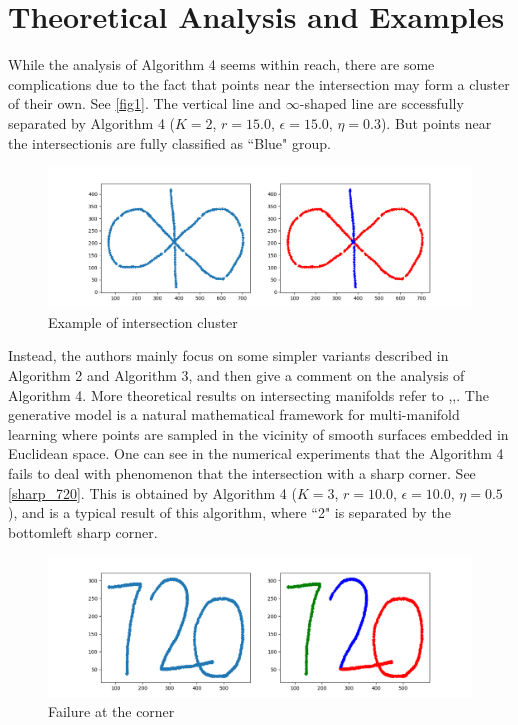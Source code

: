 \documentclass[twoside,11pt]{article}
\begin{document}
\section{Theoretical Analysis and Examples}
While the analysis of Algorithm 4 seems within reach, there are some complications due to the fact that points near the intersection may form a cluster of their own.
See \autoref{fig1}.
The vertical line and $\infty$-shaped line are sccessfully separated by Algorithm 4 ($K = 2$, $r = 15.0$, $\epsilon = 15.0$, $\eta = 0.3$).
But points near the intersectionis are fully classified as ``Blue" group. 
\begin{figure}[htbp]
\centering
\vspace{-1em}
\includegraphics[width=0.9 \textwidth]{infinity_shape.png}
\vspace{-1em}
\caption{Example of intersection cluster}
\label{fig1}
\end{figure}

Instead, the authors mainly focus on some simpler variants described in Algorithm 2 and Algorithm 3, and then give a comment on the analysis of Algorithm 4.
More theoretical results on intersecting manifolds 
refer to \cite{arias2011},\cite{chen2009},\cite{soltanolkotabi2012}.
The generative model is a natural mathematical framework for multi-manifold learning where points are sampled in the vicinity of smooth surfaces embedded in Euclidean space.
One can see in the numerical experiments that the Algorithm 4 fails to deal with phenomenon that the intersection with a sharp corner.
See \autoref{sharp_720}. This is obtained by  Algorithm 4  ($K = 3$, $r = 10.0$, $\epsilon = 10.0$, $\eta = 0.5$), and is a typical result of this algorithm, where ``2" is separated by the bottomleft sharp corner.
\begin{figure}[htbp]
\centering
\vspace{-1em}
\includegraphics[width=0.9  \textwidth]{sharp_720.png}
\vspace{-1em}
\caption{Failure at the corner}
\label{sharp_720}
\end{figure}
\end{document}
